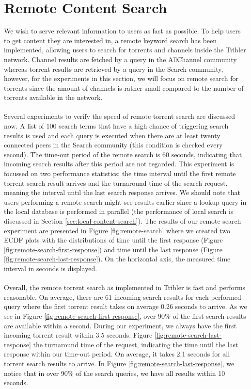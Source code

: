 \section{Remote Content Search}
\label{sec:remote-content-search-experiment}
We wish to serve relevant information to users as fast as possible. To help users to get content they are interested in, a remote keyword search has been implemented, allowing users to search for torrents and channels inside the Tribler network. Channel results are fetched by a query in the AllChannel community whereas torrent results are retrieved by a query in the Search community, however, for the experiments in this section, we will focus on remote search for torrents since the amount of channels is rather small compared to the number of torrents available in the network.\\\\
Several experiments to verify the speed of remote torrent search are discussed now. A list of 100 search terms that have a high chance of triggering search results is used and each query is executed when there are at least twenty connected peers in the Search community (this condition is checked every second). The time-out period of the remote search is 60 seconds, indicating that incoming search results after this period are not regarded. This experiment is focussed on two performance statistics: the time interval until the first remote torrent search result arrives and the turnaround time of the search request, meaning the interval until the last search response arrives. We should note that users performing a remote search might see results earlier since a lookup query in the local database is performed in parallel (the performance of local search is discussed in Section \ref{sec:local-content-search}). The results of our remote search experiment are presented in Figure \ref{fig:remote-search} where we created two ECDF plots with the distributions of time until the first response (Figure \ref{fig:remote-search-first-response}) and time until the last response (Figure \ref{fig:remote-search-last-response}). On the horizontal axis, the measured time interval in seconds is displayed.\\\\
Overall, the remote torrent search as implemented in Tribler is fast and performs reasonable. On average, there are 61 incoming search results for each performed query where the first torrent result takes on average 0.26 seconds to arrive. As we see in Figure \ref{fig:remote-search-first-response}, over 90\% of the first search results are available within a second. During our experiment, we always have the first incoming torrent result within 3.5 seconds. Figure \ref{fig:remote-search-last-response} the turnaround time of the request, indicating the time until the last response within our time-out period. On average, it takes 2.1 seconds for all torrent search results to arrive. In Figure \ref{fig:remote-search-last-response}, we notice that in over 90\% of the search queries, we have all results within 10 seconds.\\

